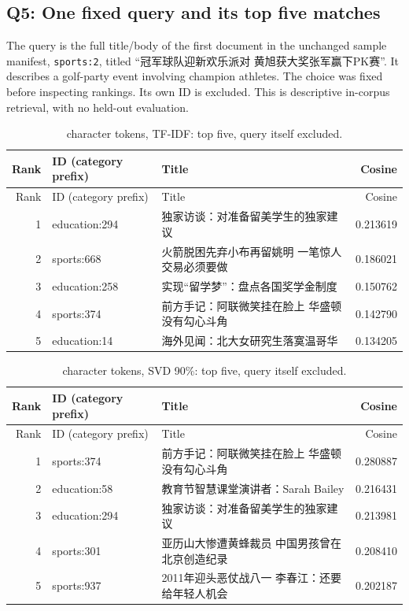 \documentclass[11pt]{article}
\renewcommand{\arraystretch}{1.15}
\begin{document}
\subsection{Q5: One fixed query and its top five matches}
The query is the full title/body of the first document in the unchanged
sample manifest, \texttt{sports:2}, titled
“冠军球队迎新欢乐派对 黄旭获大奖张军赢下PK赛”.
It describes a golf-party event involving champion athletes.
The choice was fixed before inspecting rankings. Its own ID is excluded.
This is descriptive in-corpus retrieval, with no held-out evaluation.
{\small\renewcommand{\arraystretch}{1.05}
\begin{longtable}{rp{}p{}r}
\caption{character tokens, TF-IDF: top five, query itself excluded.}\\
\toprule
Rank & ID (category prefix) & Title & Cosine \\ \midrule\endfirsthead
\toprule
Rank & ID (category prefix) & Title & Cosine \\ \midrule\endhead
1 & education:294 & 独家访谈：对准备留美学生的独家建议 & 0.213619 \\
2 & sports:668 & 火箭脱困先弃小布再留姚明 一笔惊人交易必须要做 & 0.186021 \\
3 & education:258 & 实现“留学梦”：盘点各国奖学金制度 & 0.150762 \\
4 & sports:374 & 前方手记：阿联微笑挂在脸上 华盛顿没有勾心斗角 & 0.142790 \\
5 & education:14 & 海外见闻：北大女研究生落寞温哥华 & 0.134205 \\
\bottomrule
\end{longtable}
}

{\small\renewcommand{\arraystretch}{1.05}
\begin{longtable}{rp{}p{}r}
\caption{character tokens, SVD 90\%: top five, query itself excluded.}\\
\toprule
Rank & ID (category prefix) & Title & Cosine \\ \midrule\endfirsthead
\toprule
Rank & ID (category prefix) & Title & Cosine \\ \midrule\endhead
1 & sports:374 & 前方手记：阿联微笑挂在脸上 华盛顿没有勾心斗角 & 0.280887 \\
2 & education:58 & 教育节智慧课堂演讲者：Sarah Bailey & 0.216431 \\
3 & education:294 & 独家访谈：对准备留美学生的独家建议 & 0.213981 \\
4 & sports:301 & 亚历山大惨遭黄蜂裁员 中国男孩曾在北京创造纪录 & 0.208410 \\
5 & sports:937 & 2011年迎头恶仗战八一 李春江：还要给年轻人机会 & 0.202187 \\
\bottomrule
\end{longtable}
}
\end{document}
